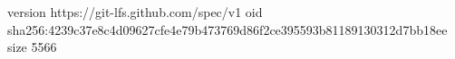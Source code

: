 version https://git-lfs.github.com/spec/v1
oid sha256:4239c37e8c4d09627cfe4e79b473769d86f2ce395593b81189130312d7bb18ee
size 5566
